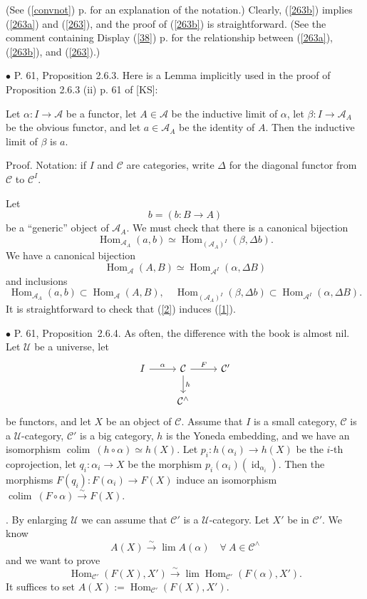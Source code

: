 \documentclass[12pt]{article}
\theoremstyle{remark}
\newcommand{\bu}{\bullet}
\newcommand{\n}{\noindent}
\newcommand{\A}{\mathcal A}
\newcommand{\C}{\mathcal C}
\newcommand{\U}{\mathcal U}
\newcommand{\pr}{Proposition}
\newcommand{\cn}{(See (\ref{convnot}) p. \pageref{convnot} for an explanation of the notation.) }
\DeclareMathOperator*{\co}{colim}
\DeclareMathOperator{\id}{id}
\DeclareMathOperator{\Hom}{Hom}
\DeclareMathOperator{\h}{Hom}
\begin{document}
\n\cn Clearly, (\ref{263b}) implies (\ref{263a}) and (\ref{263}), and the proof of (\ref{263b}) is straightforward. (See the comment containing Display (\ref{38}) p. \pageref{38} for the relationship between (\ref{263a}), (\ref{263b}), and (\ref{263}).) 


\n$\bu$ P. 61, Proposition 2.6.3. Here is a Lemma implicitly used in the proof of Proposition 2.6.3 (ii) p. 61 of [KS]: 

Let $\alpha:I\to\A$ be a functor, let $A\in\A$ be the inductive limit of $\alpha$, let $\beta:I\to\A_A$ be the obvious functor, and let $a\in\A_A$ be the identity of $A$. Then the inductive limit of $\beta$ is $a$. 

Proof. Notation: if $I$ and $\C$ are categories, write $\Delta$ for the diagonal functor from $\C$ to $\C^I$. 

Let
$$
b=(b:B\to A)
$$
be a ``generic'' object of $\A_A$. We must check that there is a canonical bijection
%
\begin{equation}\label{1}
\Hom_{\A_A}(a,b)\simeq\Hom_{(\A_A)^I}(\beta,\Delta b).
\end{equation}
%
We have a canonical bijection  
%
\begin{equation}\label{2}
\Hom_\A(A,B)\simeq\Hom_{\A^I}(\alpha,\Delta B)
\end{equation}
%
and inclusions  
$$
\Hom_{\A_A}(a,b)\subset\Hom_\A(A,B),\quad
%
\Hom_{(\A_A)^I}(\beta,\Delta b)\subset\Hom_{\A^I}(\alpha,\Delta B).
$$
It is straightforward to check that (\ref{2}) induces (\ref{1}). 


\n$\bu$ P. 61, \pr\ 2.6.4. As often, the difference with the book is almost nil. Let $\U$ be a universe, let  
$$
\begin{tikzcd}
I\ar{r}{\alpha}&\C\ar{d}{h}\ar{r}{F}&\C'\\
&\C^\wedge
\end{tikzcd}
$$
be functors, and let $X$ be an object of $\C$. Assume that $I$ is a small category, $\C$ is a $\U$-category, $\C'$ is a big category, $h$ is the Yoneda embedding, and we have an isomorphism $\co\ (h\circ\alpha)\simeq h(X)$. Let $p_i:h(\alpha_i)\to h(X)$ be the $i$-th coprojection, let $q_i:\alpha_i\to X$ be the morphism $p_i(\alpha_i)(\id_{\alpha_i})$. Then the morphisms $F(q_i):F(\alpha_i)\to F(X)$ induce an isomorphism $\co\ (F\circ\alpha)\xrightarrow\sim F(X)$. 

\n{\em Proof}. By enlarging $\U$ we can assume that $\C'$ is a $\U$-category. Let $X'$ be in $\C'$. We know 
$$
A(X)\xrightarrow\sim\lim A(\alpha)\quad\forall\ A\in\C^\wedge 
$$ 
and we want to prove 
$$
\h_{\C'}(F(X),X')\xrightarrow\sim\lim\h_{\C'}(F(\alpha),X'). 
$$ 
It suffices to set $A(X):=\h_{\C'}(F(X),X')$. 
\end{document}

